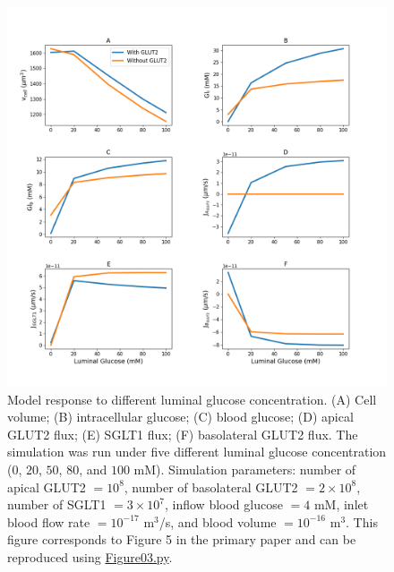 \documentclass[fleqn,10pt]{physiome}
\begin{document}
\begin{figure}[htb]
\centering
\includegraphics[width=0.9\linewidth]{Figure03}
\caption{Model response to different luminal glucose concentration. (A) Cell volume; (B) intracellular glucose; (C) blood glucose; (D) apical GLUT2 flux; (E) SGLT1 flux; (F) basolateral GLUT2 flux. The simulation was run under five different luminal glucose concentration ($0$, $20$, $50$, $80$, and $100$ mM). Simulation parameters: number of apical GLUT2 $=10^8$, number of basolateral GLUT2 $=2\times10^8$, number of SGLT1 $=3\times10^7$, inflow blood glucose $=4$ mM, inlet blood flow rate $=10^{-17}$ m${^3}$/s, and blood volume $=10^{-16}$ m$^3$. This figure corresponds to Figure 5 in the primary paper and can be reproduced using \href{https://models.physiomeproject.org/workspace/840/rawfile/bc7a5ac43ddbd15d234e66d8cb17df8388d80064/Figure03.py}{Figure03.py}.}
\label{Figure3}
\end{figure}
\end{document}
